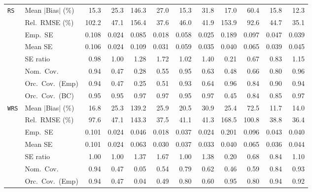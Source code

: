 \begin{landscape}
\begin{longtable}{llrrrrrrrrrr}
\quad \texttt{RS} & Mean $|$Bias$|$ (\%) & \cellcolor{rankthree}15.3 & 25.3 & 146.3 & 27.0 & \cellcolor{ranktwo}15.3 & 31.8 & 17.0 & 60.4 & 15.8 & \cellcolor{rankone}12.3 \\
 & Rel.\ RMSE (\%) & 102.2 & 47.1 & 156.4 & \cellcolor{ranktwo}37.6 & 46.0 & \cellcolor{rankthree}41.9 & 153.9 & 92.6 & 44.7 & \cellcolor{rankone}35.1 \\
 & Emp.\ SE & 0.108 & 0.024 & 0.085 & 0.018 & 0.058 & 0.025 & 0.189 & 0.097 & 0.047 & 0.039 \\
 & Mean SE & 0.106 & 0.024 & 0.109 & 0.031 & 0.059 & 0.035 & 0.040 & 0.065 & 0.039 & 0.045 \\
 & SE ratio & \cellcolor{rankthree}0.98 & \cellcolor{rankone}1.00 & 1.28 & 1.72 & \cellcolor{ranktwo}1.02 & 1.40 & 0.21 & 0.67 & 0.83 & 1.15 \\
 & Nom.\ Cov. & \cellcolor{ranktwo}0.94 & 0.47 & 0.28 & 0.55 & \cellcolor{rankone}0.95 & 0.63 & 0.48 & 0.66 & 0.80 & \cellcolor{rankthree}0.96 \\
 & Orc.\ Cov.\ (Emp) & \cellcolor{rankthree}0.94 & 0.47 & 0.25 & 0.51 & 0.93 & 0.64 & \cellcolor{rankone}0.96 & 0.84 & 0.90 & \cellcolor{ranktwo}0.94 \\
 & Orc.\ Cov.\ (BC) & \cellcolor{rankone}0.95 & \cellcolor{rankthree}0.95 & 0.97 & 0.97 & \cellcolor{ranktwo}0.95 & 0.97 & 0.45 & 0.84 & 0.85 & 0.97 \\
\addlinespace[2pt]
\quad \texttt{WRS} & Mean $|$Bias$|$ (\%) & \cellcolor{rankthree}16.8 & 25.3 & 139.2 & 25.9 & 20.5 & 30.9 & 25.4 & 72.5 & \cellcolor{rankone}11.7 & \cellcolor{ranktwo}14.0 \\
 & Rel.\ RMSE (\%) & 97.6 & 47.1 & 143.3 & \cellcolor{ranktwo}37.5 & 41.1 & 41.3 & 168.5 & 100.8 & \cellcolor{rankthree}38.8 & \cellcolor{rankone}36.4 \\
 & Emp.\ SE & 0.101 & 0.024 & 0.046 & 0.018 & 0.037 & 0.024 & 0.201 & 0.096 & 0.043 & 0.040 \\
 & Mean SE & 0.101 & 0.024 & 0.063 & 0.030 & 0.037 & 0.033 & 0.040 & 0.065 & 0.036 & 0.044 \\
 & SE ratio & \cellcolor{rankone}1.00 & \cellcolor{ranktwo}1.00 & 1.37 & 1.67 & \cellcolor{rankthree}1.00 & 1.38 & 0.20 & 0.68 & 0.84 & 1.10 \\
 & Nom.\ Cov. & \cellcolor{rankone}0.94 & 0.47 & 0.05 & 0.54 & 0.79 & 0.62 & 0.46 & 0.59 & \cellcolor{rankthree}0.84 & \cellcolor{ranktwo}0.93 \\
 & Orc.\ Cov.\ (Emp) & \cellcolor{rankthree}0.94 & 0.47 & 0.04 & 0.49 & 0.80 & 0.60 & \cellcolor{rankone}0.95 & 0.80 & \cellcolor{ranktwo}0.94 & 0.92 \\

\end{longtable}
\end{landscape}
